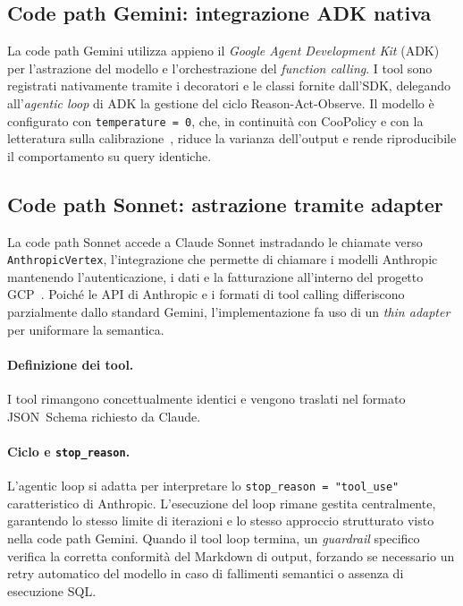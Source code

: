 \subsection{Code path Gemini: integrazione ADK nativa}
\label{subsec:sysaid-gemini}

La code path Gemini utilizza appieno il \emph{Google Agent Development Kit} (ADK)
per l'astrazione del modello e l'orchestrazione del \emph{function calling}. I tool sono
registrati nativamente tramite i decoratori e le classi fornite dall'SDK,
delegando all'\emph{agentic loop} di ADK la gestione del ciclo Reason-Act-Observe.
Il modello è configurato con \texttt{temperature = 0},
che, in continuità con CooPolicy e con la letteratura sulla
calibrazione~\cite{kadavath2022knowsknows}, riduce la varianza
dell'output e rende riproducibile il comportamento su query
identiche.

\subsection{Code path Sonnet: astrazione tramite adapter}
\label{subsec:sysaid-sonnet}

La code path Sonnet accede a Claude Sonnet
instradando le chiamate verso \texttt{AnthropicVertex},
l'integrazione che permette di chiamare i modelli Anthropic mantenendo l'autenticazione, i dati 
e la fatturazione all'interno del progetto GCP~\cite{anthropic_docs}. Poiché le API di Anthropic
e i formati di tool calling differiscono parzialmente dallo standard Gemini,
l'implementazione fa uso di un \emph{thin adapter} per uniformare la semantica.

\paragraph{Definizione dei tool.} I tool rimangono concettualmente identici e
vengono traslati nel formato JSON~Schema richiesto da Claude.

\paragraph{Ciclo e \texttt{stop\_reason}.} L'agentic loop si adatta per interpretare
lo \texttt{stop\_reason = "tool\_use"} caratteristico di Anthropic.
L'esecuzione del loop rimane gestita centralmente, garantendo lo stesso limite di iterazioni
e lo stesso approccio strutturato visto nella code path Gemini. Quando il tool loop termina,
un \emph{guardrail} specifico verifica la corretta conformità del Markdown di output, forzando
se necessario un retry automatico del modello in caso di fallimenti semantici o assenza di esecuzione SQL.

